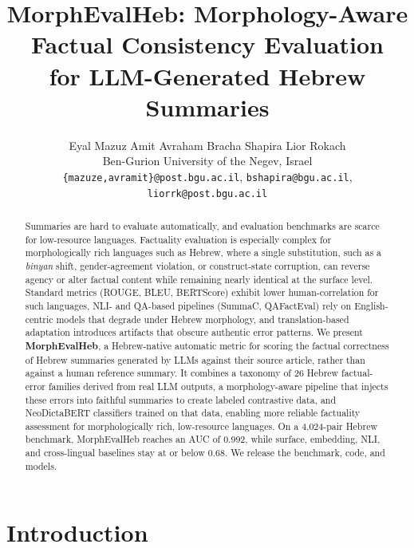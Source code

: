 \documentclass[11pt]{article}
\title{MorphEvalHeb: Morphology-Aware Factual Consistency Evaluation\\for LLM-Generated Hebrew Summaries}
\author{
Eyal Mazuz \quad Amit Avraham \quad Bracha Shapira \quad Lior Rokach \\
Ben-Gurion University of the Negev, Israel \\
\texttt{\{mazuze,avramit\}@post.bgu.ac.il}, \texttt{bshapira@bgu.ac.il}, \texttt{liorrk@post.bgu.ac.il}
}
\begin{document}
\maketitle
\begin{abstract}
Summaries are hard to evaluate automatically, and evaluation benchmarks are scarce for low-resource languages.
Factuality evaluation is especially complex for morphologically rich languages such as Hebrew, where a single substitution, such as a \textit{binyan} shift, gender-agreement violation, or construct-state corruption, can reverse agency or alter factual content while remaining nearly identical at the surface level.
Standard metrics (ROUGE, BLEU, BERTScore) exhibit lower human-correlation for such languages, NLI- and QA-based pipelines (SummaC, QAFactEval) rely on English-centric models that degrade under Hebrew morphology, and translation-based adaptation introduces artifacts that obscure authentic error patterns.
We present \textbf{MorphEvalHeb}, a Hebrew-native automatic metric for scoring the factual correctness of Hebrew summaries generated by LLMs against their source article, rather than against a human reference summary. It combines a taxonomy of 26 Hebrew factual-error families derived from real LLM outputs, a morphology-aware pipeline that injects these errors into faithful summaries to create labeled contrastive data, and NeoDictaBERT classifiers trained on that data, enabling more reliable factuality assessment for morphologically rich, low-resource languages.
On a 4,024-pair Hebrew benchmark, MorphEvalHeb reaches an AUC of 0.992, while surface, embedding, NLI, and cross-lingual baselines stay at or below 0.68. We release the benchmark, code, and models.
\end{abstract}
\section{Introduction}
\end{document}
